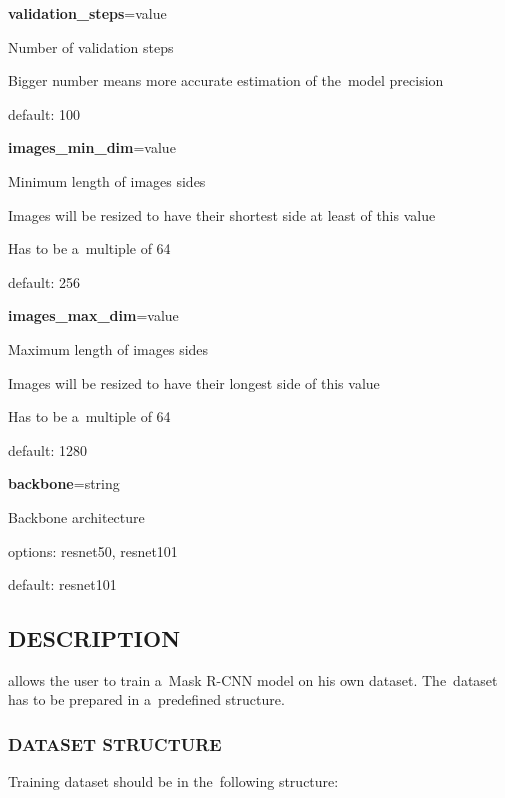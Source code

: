 \begin{flushleft}
\textbf{validation\_steps}=value

\tab Number of validation steps

\tab Bigger number means more accurate estimation of the~model precision

\tab default: 100

\textbf{images\_min\_dim}=value

\tab Minimum length of images sides

\tab Images will be resized to have their shortest side at least of this value

\tab Has to be a~multiple of 64

\tab default: 256

\textbf{images\_max\_dim}=value

\tab Maximum length of images sides

\tab Images will be resized to have their longest side of this value

\tab Has to be a~multiple of 64

\tab default: 1280

\textbf{backbone}=string

\tab Backbone architecture

\tab options: resnet50, resnet101

\tab default: resnet101
\end{flushleft}

\subsection*{DESCRIPTION}
 allows the user to train a~Mask R-CNN
model on his own dataset. The~dataset has to be prepared in a~predefined
structure. 

\subsubsection*{DATASET STRUCTURE}
Training dataset should be in the~following structure: 

